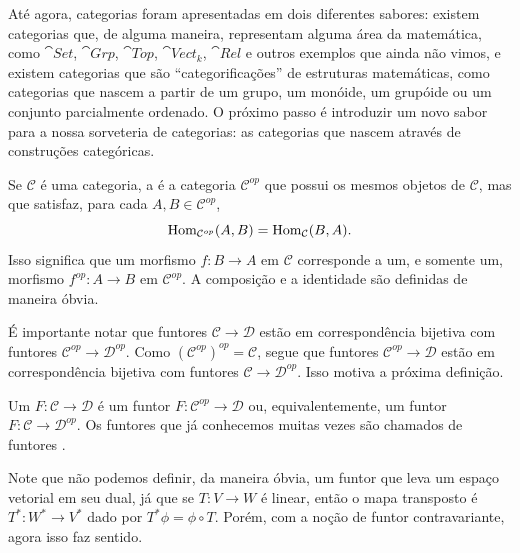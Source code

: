 Até agora, categorias foram apresentadas em dois diferentes sabores: existem categorias que, de alguma maneira, representam alguma área da matemática, como $\cat{Set}$, $\cat{Grp}$, $\cat{Top}$, $\cat{Vect}_k$, $\cat{Rel}$ e outros exemplos que ainda não vimos, e existem categorias que são ``categorificações'' de estruturas matemáticas, como categorias que nascem a partir de um grupo, um monóide, um grupóide ou um conjunto parcialmente ordenado. O próximo passo é introduzir um novo sabor para a nossa sorveteria de categorias: as categorias que nascem através de construções categóricas.

\begin{definicao}
    Se $\mathcal{C}$ é uma categoria, a  é a categoria $\mathcal{C}^{op}$ que possui os mesmos objetos de $\mathcal{C}$, mas que satisfaz, para cada $A, B \in \mathcal{C}^{op}$, \begin{equation*}
        \operatorname{Hom}_{\mathcal{C}^{op}}(A,B) = \operatorname{Hom}_{\mathcal{C}}(B,A).
    \end{equation*} Isso significa que um morfismo $f \colon B \to A$ em $\mathcal{C}$ corresponde a um, e somente um, morfismo $f^{op} \colon A \to B$ em $\mathcal{C}^{op}$. A composição e a identidade são definidas de maneira óbvia.
\end{definicao}

É importante notar que funtores $\mathcal{C} \to \mathcal{D}$ estão em correspondência bijetiva com funtores $\mathcal{C}^{op} \to \mathcal{D}^{op}$. Como $(\mathcal{C}^{op})^{op} = \mathcal{C}$, segue que funtores $\mathcal{C}^{op} \to \mathcal{D}$ estão em correspondência bijetiva com funtores $\mathcal{C} \to \mathcal{D}^{op}$. Isso motiva a próxima definição.

\begin{definicao}
    Um  $F \colon \mathcal{C} \to \mathcal{D}$ é um funtor $F \colon \mathcal{C}^{op} \to \mathcal{D}$ ou, equivalentemente, um funtor $F \colon \mathcal{C} \to \mathcal{D}^{op}$. Os funtores que já conhecemos muitas vezes são chamados de funtores .
\end{definicao}

\begin{exemplo}
    Note que não podemos definir, da maneira óbvia, um funtor que leva um espaço vetorial em seu dual, já que se $T \colon V \to W$ é linear, então o mapa transposto é $T^* \colon W^* \to V^*$ dado por $T^*\phi = \phi \circ T$. Porém, com a noção de funtor contravariante, agora isso faz sentido.
\end{exemplo}